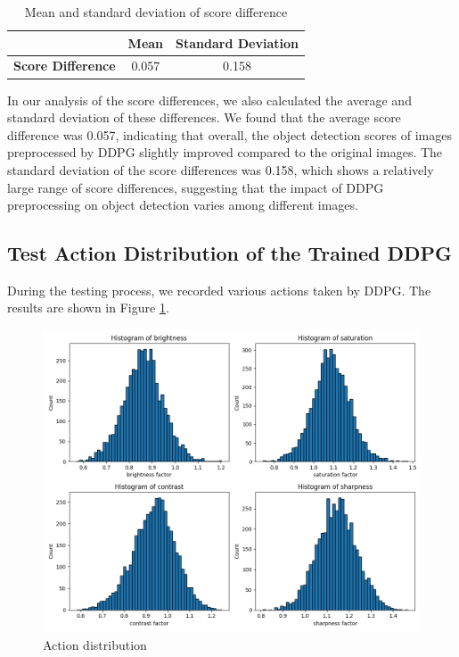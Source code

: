 \documentclass{PHlab-thesis}
\begin{document}
\begin{table}[H]
    \centering
    \label{table:mean_and_std} 
    \begin{tabular}{c c c}
        \toprule
        & \textbf{Mean} & \textbf{Standard Deviation} \\
        \midrule
        \textbf{Score Difference} & 0.057 & 0.158 \\
        \bottomrule
    \end{tabular}
    \caption{Mean and standard deviation of score difference}
\end{table}

In our analysis of the score differences, we also calculated the average and standard deviation of these differences. We found that the average score difference was 0.057, indicating that overall, the object detection scores of images preprocessed by DDPG slightly improved compared to the original images. The standard deviation of the score differences was 0.158, which shows a relatively large range of score differences, suggesting that the impact of DDPG preprocessing on object detection varies among different images.

\subsection{Test Action Distribution of the Trained DDPG}
During the testing process, we recorded various actions taken by DDPG. The results are shown in Figure \ref{Fig.Action distribution}.

\begin{figure}[H] 
    \centering 
    \includegraphics[width=\textwidth]{images/action distribution.png}
    \caption{Action distribution}
    \label{Fig.Action distribution} 
\end{figure}
\clearpage
\end{document}
